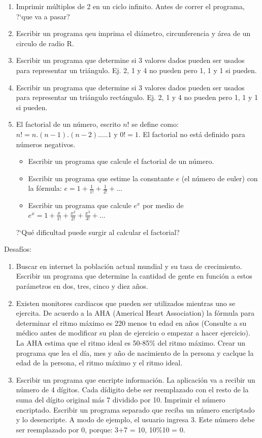 \documentclass[12pt]{article}
\begin{document}
\begin{enumerate}
    \item Imprimir m\'ultiplos de 2 en un ciclo infinito. Antes de correr el programa, ?`que va a pasar?
    \item Escribir un programa qeu imprima el di\'ametro, circunferencia y \'area de un circulo de radio R. 
    \item Escribir un programa que determine si 3 valores dados pueden ser usados para representar un tri\'angulo. Ej. 2, 1 y 4 no pueden pero
        1, 1 y 1 si pueden.
    \item Escribir un programa que determine si 3 valores dados pueden ser usados para representar un tri\'angulo rect\'angulo. Ej. 2, 1 y 4 no pueden pero
        1, 1 y 1 si pueden.
    \item El factorial de un n\'umero, escrito $n!$ se define como: $n! = n.(n-1).(n-2).\ldots.1$ y $0! = 1$. El factorial no est\'a definido para n\'umeros negativos.
        \begin{itemize}
            \item Escribir un programa que calcule el factorial de un n\'umero.
            \item Escribir un programa que estime la consntante $e$ (el n\'umero de euler) con la f\'ormula: $e = 1 + \frac{1}{1!} + \frac{1}{2!} + \ldots$
            \item Escribir un programa que calcule $e^x$ por medio de $ e^x = 1 + \frac{x}{1!} + \frac{x^2}{2!} + \frac{x^3}{3!} + \ldots $
        \end{itemize}
        ?`Qu\'e dificultad puede surgir al calcular el factorial?
\end{enumerate}

Desaf\'ios:
\begin{enumerate}
    \item Buscar en internet la poblaci\'on actual mundial y su tasa de crecimiento. Escribir un programa que determine la cantidad de gente
        en funci\'on a estos par\'ametros en dos, tres, cinco y diez a\~nos.
    \item Existen monitores cardiacos que pueden ser utilizados mientras uno se ejercita. De acuerdo a la AHA (Americal Heart Association) la f\'ormula
        para determinar el ritmo m\'aximo es 220 menos tu edad en a\~nos (Consulte a su m\'edico antes de modificar su plan de ejercicio o empezar a hacer ejercicio). La AHA estima que el ritmo ideal es 50-85\% del ritmo m\'aximo. Crear un programa que lea el d\'ia, mes y a\~no de nacimiento de la persona y caclque la edad de la persona, el ritmo m\'aximo y el ritmo ideal.
    \item Escribir un programa que encripte informaci\'on. La aplicaci\'on va a recibir un n\'umero de 4 d\'igitos. Cada d\'idigito debe ser reemplazado con el resto de la suma del d\'igito original m\'as 7 dividido por 10. Imprimir el n\'umero encriptado. Escribir un programa separado que reciba un n\'umero encriptado y lo desencripte.  A modo de ejemplo, el usuario ingresa 3. Este n\'umero debe ser reemplazado por 0, porque: 3+7 = 10, 10\%10 = 0.
\end{enumerate}
\end{document}
